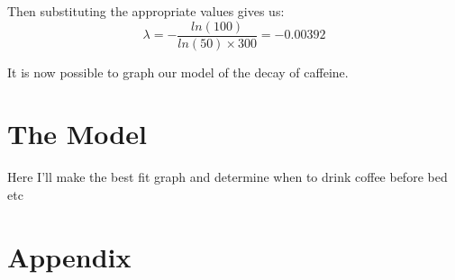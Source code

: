 \documentclass[12pt]{article}
\begin{document}
                \noindent 
                Then substituting the appropriate values gives us:
                        $$\lambda = -\frac{ln(100)}{ln(50)\times 300} = -0.00392$$

                It is now possible to graph our model of the decay of caffeine.
                  
                \section{The Model}

                Here I'll make the best fit graph and determine when to drink coffee before bed etc

                        
                
                \pagebreak
                \section{Appendix}
                \inputminted{python}{decay.py} %
\end{document}
